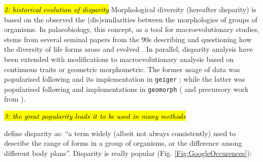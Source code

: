\documentclass[12pt,letterpaper]{article}
\begin{document}
\noindent \hl{\textit{2: historical evolution of disparity}}
Morphological diversity (hereafter disparity) is based on the observed the (dis)similarities between the morphologies of groups of organisms.
In palaeobiology, this concept, as a tool for macroevolutionary studies, stems from several seminal papers from the 90s describing and questioning how the diversity of life forms arose and evolved \citep{gould1989wonderful,gould1991disparity,briggs1992morphological,Wills1994,Foote01071994,Foote29111996,jernvall1996molar,foote1997evolution}.
In parallel, disparity analysis have been extended with modifications to macroevolutionary analysis based on continuous traits or geometric morphometric.
The former usage of data was popularised following \cite{Harmon961} and its implementation in \texttt{geiger} \citep{geiger2008}; while the latter was popularised following \citep{zelditch2012geometric} %
and implementations in \texttt{geomorph} (\citealt{adams2013geomorph, adams2017geometric} and precursory work from \citealt{claude2008morphometrics}).


\noindent \hl{\textit{3: the great popularity leads it to be used in many methods}}

\cite{prentice2011} define disparity as: ``a term widely (albeit not always consistently) used to describe the range of forms in a group of organisms, or the difference among different body plans''.
Disparity is really popular (Fig. \ref{Fig:GoogleOccurences}):
\end{document}
